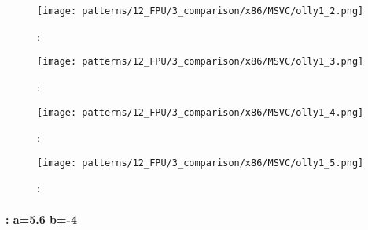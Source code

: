 \begin{figure}[H]
\centering
\texttt{[image: patterns/12\_FPU/3\_comparison/x86/MSVC/olly1\_2.png]}
\caption{\olly: \FCOMP {}}
\label{fig:FPU_comparison_case1_olly2}
\end{figure}

\begin{figure}[H]
\centering
\texttt{[image: patterns/12\_FPU/3\_comparison/x86/MSVC/olly1\_3.png]}
\caption{\olly: \FNSTSW {}}
\label{fig:FPU_comparison_case1_olly3}
\end{figure}

\begin{figure}[H]
\centering
\texttt{[image: patterns/12\_FPU/3\_comparison/x86/MSVC/olly1\_4.png]}
\caption{\olly: \TEST {}}
\label{fig:FPU_comparison_case1_olly4}
\end{figure}

\begin{figure}[H]
\centering
\texttt{[image: patterns/12\_FPU/3\_comparison/x86/MSVC/olly1\_5.png]}
\caption{\olly: }
\label{fig:FPU_comparison_case1_olly5}
\end{figure}

\paragraph{: a=5.6 \AndENRU b=-4}

